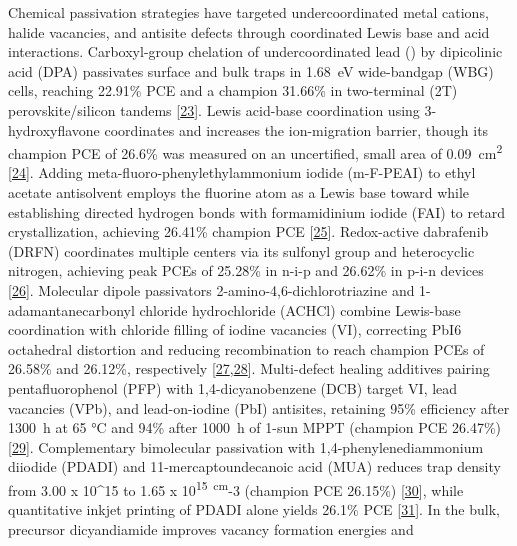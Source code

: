 \documentclass[
  11pt,
]{article}
\begin{document}
Chemical passivation strategies have targeted undercoordinated metal
cations, halide vacancies, and antisite defects through coordinated
Lewis base and acid interactions. Carboxyl-group chelation of
undercoordinated lead () by dipicolinic acid (DPA) passivates
surface and bulk traps in \qty{1.68}{\electronvolt} wide-bandgap (WBG)
cells, reaching 22.91\% PCE and a champion 31.66\% in two-terminal (2T)
perovskite/silicon tandems
{[}\href{https://doi.org/10.1002/aenm.70902}{23}{]}. Lewis acid-base
coordination using 3-hydroxyflavone coordinates  and increases
the ion-migration barrier, though its champion PCE of 26.6\% was
measured on an uncertified, small area of
\qty{0.09}{\centi\meter\squared}
{[}\href{https://doi.org/10.1002/smll.73673}{24}{]}. Adding
meta-fluoro-phenylethylammonium iodide (m-F-PEAI) to ethyl acetate
antisolvent employs the fluorine atom as a Lewis base toward 
while establishing directed hydrogen bonds with formamidinium iodide
(FAI) to retard crystallization, achieving 26.41\% champion PCE
{[}\href{https://doi.org/10.1021/acsaem.6c00562}{25}{]}. Redox-active
dabrafenib (DRFN) coordinates multiple  centers via its
sulfonyl group and heterocyclic nitrogen, achieving peak PCEs of 25.28\%
in n-i-p and 26.62\% in p-i-n devices
{[}\href{https://doi.org/10.1002/adfm.76623}{26}{]}. Molecular dipole
passivators 2-amino-4,6-dichlorotriazine and 1-adamantanecarbonyl
chloride hydrochloride (ACHCl) combine Lewis-base coordination with
chloride filling of iodine vacancies (VI), correcting PbI6 octahedral
distortion and reducing recombination to reach champion PCEs of 26.58\%
and 26.12\%, respectively
{[}\href{https://doi.org/10.1021/acsmaterialslett.5c01678}{27},\href{https://doi.org/10.1007/s40820-026-02150-7}{28}{]}.
Multi-defect healing additives pairing pentafluorophenol (PFP) with
1,4-dicyanobenzene (DCB) target VI, lead vacancies (VPb), and
lead-on-iodine (PbI) antisites, retaining 95\% efficiency after
\qty{1300}{\hour} at 65 °C and 94\% after \qty{1000}{\hour} of 1-sun
MPPT (champion PCE 26.47\%)
{[}\href{https://doi.org/10.1002/smll.73436}{29}{]}. Complementary
bimolecular passivation with 1,4-phenylenediammonium diiodide (PDADI)
and 11-mercaptoundecanoic acid (MUA) reduces trap density from 3.00 x
10\^{}15 to 1.65 x 10\textsuperscript{\qty{15}{\centi\meter}}-3
(champion PCE 26.15\%)
{[}\href{https://doi.org/10.1002/adfm.202532110}{30}{]}, while
quantitative inkjet printing of PDADI alone yields 26.1\% PCE
{[}\href{https://doi.org/10.1002/smll.73886}{31}{]}. In the bulk,
precursor dicyandiamide improves vacancy formation energies and
\end{document}
